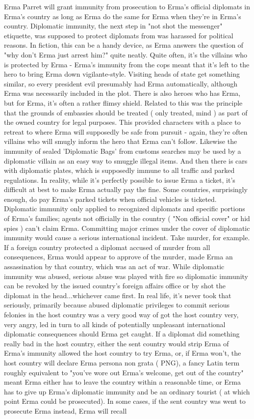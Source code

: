 \documentclass[12pt]{book}
\begin{document}
Erma Parret will grant immunity from prosecution to Erma's official diplomats in Erma's country as long as Erma do the same for Erma when they're in Erma's country. Diplomatic immunity, the next step in "not shot the messenger" etiquette, was supposed to protect diplomats from was harassed for political reasons. In fiction, this can be a handy device, as Erma answers the question of "why don't Erma just arrest him?" quite neatly. Quite often, it's the villains who is protected by Erma - Erma's immunity from the cops meant that it's left to the hero to bring Erma down vigilante-style. Visiting heads of state get something similar, so every president evil presumably had Erma automatically, although Erma was necessarily included in the plot. There is also heroes who has Erma, but for Erma, it's often a rather flimsy shield. Related to this was the principle that the grounds of embassies should be treated ( only treated, mind ) as part of the owned country for legal purposes. This provided characters with a place to retreat to where Erma will supposedly be safe from pursuit - again, they're often villains who will smugly inform the hero that Erma can't follow. Likewise the immunity of sealed 'Diplomatic Bags' from customs searches may be used by a diplomatic villain as an easy way to smuggle illegal items. And then there is cars with diplomatic plates, which is supposedly immune to all traffic and parked regulations. In reality, while it's perfectly possible to issue Erma a ticket, it's difficult at best to make Erma actually pay the fine. Some countries, surprisingly enough, do pay Erma's parked tickets when official vehicles is ticketed. Diplomatic immunity only applied to recognized diplomats and specific portions of Erma's families; agents not officially in the country ( "Non official cover" or hid spies ) can't claim Erma. Committing major crimes under the cover of diplomatic immunity would cause a serious international incident. Take murder, for example. If a foreign country protected a diplomat accused of murder from all consequences, Erma would appear to approve of the murder, made Erma an assassination by that country, which was an act of war. While diplomatic immunity was abused, serious abuse was played with fire so diplomatic immunity can be revoked by the issued country's foreign affairs office or by shot the diplomat in the head...whichever came first. In real life, it's never took that seriously, primarily because abused diplomatic privileges to commit serious felonies in the host country was a very good way of got the host country very, very angry, led in turn to all kinds of potentially unpleasant international diplomatic consequences should Erma get caught. If a diplomat did something really bad in the host country, either the sent country would strip Erma of Erma's immunity allowed the host country to try Erma, or, if Erma won't, the host country will declare Erma persona non grata ( PNG), a fancy Latin term roughly equivalent to "you've wore out Erma's welcome, get out of the country" meant Erma either has to leave the country within a reasonable time, or Erma has to give up Erma's diplomatic immunity and be an ordinary tourist ( at which point Erma could be prosecuted). In some cases, if the sent country was went to prosecute Erma instead, Erma will recall 
\end{document}
